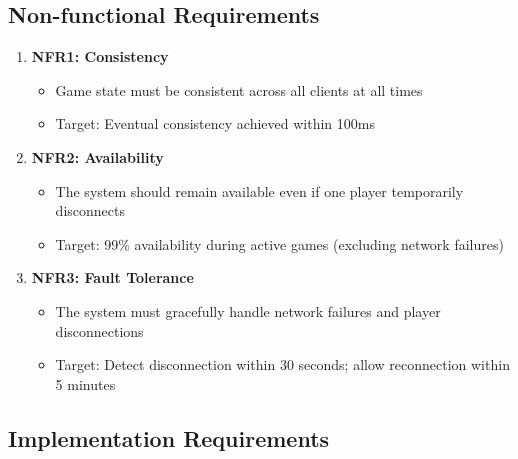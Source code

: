 \documentclass{scrartcl}
\begin{document}
\subsection{Non-functional Requirements}

\begin{enumerate}
  \item \textbf{NFR1: Consistency}
  \begin{itemize}
    \item Game state must be consistent across all clients at all times
    \item Target: Eventual consistency achieved within 100ms
  \end{itemize}

  \item \textbf{NFR2: Availability}
  \begin{itemize}
    \item The system should remain available even if one player temporarily disconnects
    \item Target: 99\% availability during active games (excluding network failures)
  \end{itemize}


  \item \textbf{NFR3: Fault Tolerance}
  \begin{itemize}
    \item The system must gracefully handle network failures and player disconnections
    \item Target: Detect disconnection within 30 seconds; allow reconnection within 5 minutes
  \end{itemize}

\end{enumerate}

\subsection{Implementation Requirements}
\end{document}
